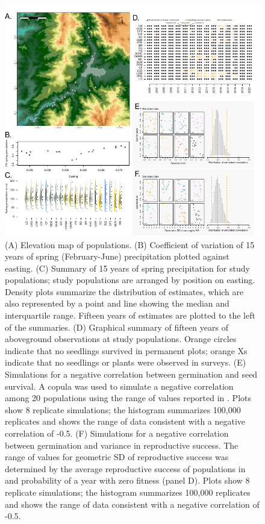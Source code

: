 \documentclass[12pt, oneside, titlepage]{article}   	%
\begin{document}
{\begin{figure}[t]
	\includegraphics[width=\textwidth]{../manuscript/figures/intro-figure.pdf}  
        \caption{ \footnotesize (A) Elevation map of populations. (B) Coefficient of variation of 15 years of spring (February-June) precipitation plotted against easting. (C) Summary of 15 years of spring precipitation for study populations; study populations are arranged by position on easting. Density plots summarize the distribution of estimates, which are also represented by a point and line showing the median and interquartile range. Fifteen years of estimates are plotted to the left of the summaries. (D) Graphical summary of fifteen years of aboveground observations at study populations. Orange circles indicate that no seedlings survived in permanent plots; orange Xs indicate that no seedlings or plants were observed in surveys. (E) Simulations for a negative correlation between germination and seed survival. A copula was used to simulate a negative correlation among 20 populations using the range of values reported in \cite{eckhart2011}. Plots show 8 replicate simulations; the histogram summarizes 100,000 replicates and shows the range of data consistent with a negative correlation of -0.5. (F) Simulations for a negative correlation between germination and variance in reproductive success. The range of values for geometric SD of reproductive success was determined by the average reproductive success of populations in \cite{eckhart2011} and probability of a year with zero fitness (panel D). Plots show 8 replicate simulations; the histogram summarizes 100,000 replicates and shows the range of data consistent with a negative correlation of -0.5. }
        \label{fig:intro-figure}
\end{figure}


}
\end{document}
